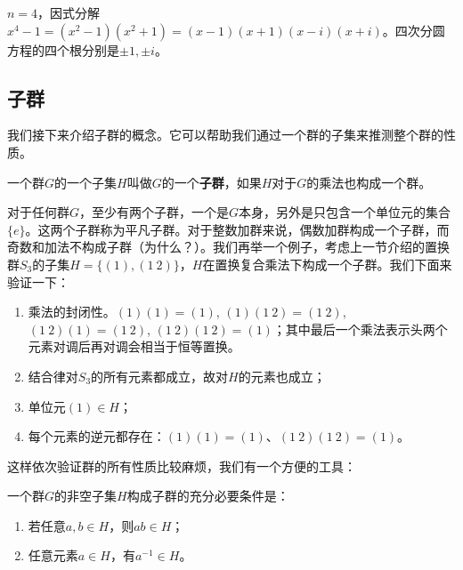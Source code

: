 \documentclass[b5paper]{ctexart}
\begin{document}
$n = 4$，因式分解$x^4 - 1 = (x^2 - 1)(x^2 + 1) = (x - 1)(x + 1)(x - i)(x + i)$。四次分圆方程的四个根分别是$\pm 1, \pm i$。



\begin{Exercise}
\end{Exercise}

\subsection{子群}

我们接下来介绍子群的概念。它可以帮助我们通过一个群的子集来推测整个群的性质。

\begin{definition}
一个群$G$的一个子集$H$叫做$G$的一个\textbf{子群}，如果$H$对于$G$的乘法也构成一个群。
\end{definition}

对于任何群$G$，至少有两个子群，一个是$G$本身，另外是只包含一个单位元的集合$\{e\}$。这两个子群称为平凡子群。对于整数加群来说，偶数加群构成一个子群，而奇数和加法不构成子群（为什么？）。我们再举一个例子，考虑上一节介绍的置换群$S_3$的子集$H = \{(1), (1\ 2)\}$，$H$在置换复合乘法下构成一个子群。我们下面来验证一下：

\begin{enumerate}
\item 乘法的封闭性。$(1)(1) = (1)$, $(1)(1\ 2) = (1\ 2)$, $(1\ 2)(1) = (1\ 2)$, $(1\ 2) (1\ 2) = (1)$；其中最后一个乘法表示头两个元素对调后再对调会相当于恒等置换。
\item 结合律对$S_3$的所有元素都成立，故对$H$的元素也成立；
\item 单位元$(1) \in H$；
\item 每个元素的逆元都存在：$(1)(1) = (1)$、$(1\ 2) (1\ 2) = (1)$。
\end{enumerate}

这样依次验证群的所有性质比较麻烦，我们有一个方便的工具：

\begin{theorem}
一个群$G$的非空子集$H$构成子群的充分必要条件是：
\begin{enumerate}
\item 若任意$a, b \in H$，则$ab \in H$；
\item 任意元素$a \in H$，有$a^{-1} \in H$。
\end{enumerate}
\label{theorem:subgroup}
\end{theorem}
\end{document}
